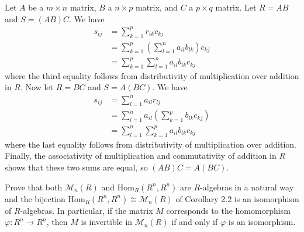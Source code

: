 \documentclass[../../master.tex]{subfiles}
\begin{document}
\begin{solution}
    Let $A$ be a $m \times n$ matrix, $B$ a $n \times p$ matrix, and $C$ a $p \times q$ matrix.
    Let $R = AB$ and $S = (AB)C$.
    We have
    \begin{align*}
        s_{ij} &= \sum_{k=1}^{p}r_{ik} c_{kj} \\
               &=  \sum_{k=1}^{p} \left( \sum_{l=1}^{n} a_{il} b_{lk} \right) c_{kj} \\
               &= \sum_{k=1}^{p} \sum_{l=1}^{n} a_{il} b_{lk} c_{kj}
    \end{align*}
    where the third equality follows from distributivity of multiplication over addition in $R$.
    Now let $R = BC$ and $S = A(BC)$.
    We have
    \begin{align*}
        s_{ij} &= \sum_{l=1}^{n} a_{il} r_{lj} \\
               &= \sum_{l=1}^{n} a_{il} \left( \sum_{k=1}^{p} b_{lk} c_{kj} \right) \\
               &= \sum_{l=1}^{n} \sum_{k=1}^{p} a_{il} b_{lk} c_{kj}
    \end{align*}
    where the last equality follows from distributivity of multiplication over addition.
    Finally, the associativity of multiplication and commutativity of addition in $R$ shows that these two sums are equal, so $(AB)C = A(BC)$.
\end{solution}

\begin{problem}
    Prove that both $\mathcal{M}_n(R)$ and $\text{Hom}_{R}(R^{n}, R^{n})$ are $R$-algebras in a natural way and the bijection $\text{Hom}_{R}(R^{n}, R^{n}) \cong \mathcal{M}_n(R)$ of Corollary 2.2 is an isomorphism of $R$-algebras.
    In particular, if the matrix $M$ corresponds to the homomorphism $\varphi: R^{n} \to R^{n}$, then $M$ is invertible in $\mathcal{M}_n(R)$ if and only if $\varphi$ is an isomorphism.
\end{problem}
\end{document}

